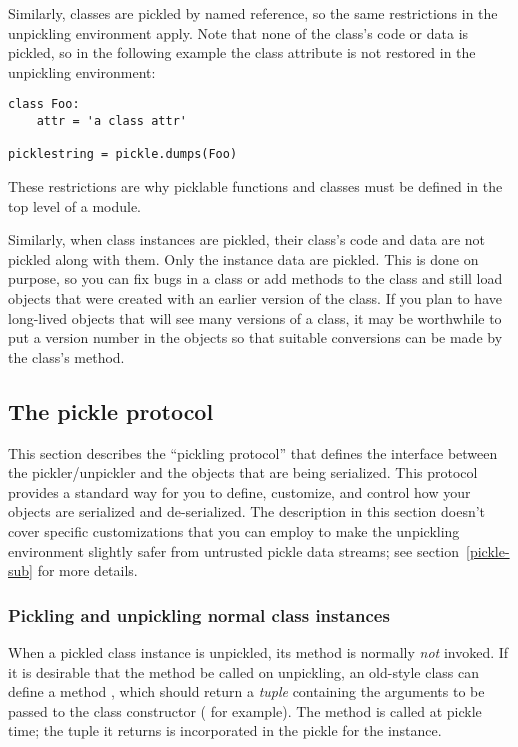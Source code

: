 Similarly, classes are pickled by named reference, so the same
restrictions in the unpickling environment apply.  Note that none of
the class's code or data is pickled, so in the following example the
class attribute  is not restored in the unpickling
environment:

\begin{verbatim}
class Foo:
    attr = 'a class attr'

picklestring = pickle.dumps(Foo)
\end{verbatim}

These restrictions are why picklable functions and classes must be
defined in the top level of a module.

Similarly, when class instances are pickled, their class's code and
data are not pickled along with them.  Only the instance data are
pickled.  This is done on purpose, so you can fix bugs in a class or
add methods to the class and still load objects that were created with
an earlier version of the class.  If you plan to have long-lived
objects that will see many versions of a class, it may be worthwhile
to put a version number in the objects so that suitable conversions
can be made by the class's  method.

\subsection{The pickle protocol
\label{pickle-protocol}}

This section describes the ``pickling protocol'' that defines the
interface between the pickler/unpickler and the objects that are being
serialized.  This protocol provides a standard way for you to define,
customize, and control how your objects are serialized and
de-serialized.  The description in this section doesn't cover specific
customizations that you can employ to make the unpickling environment
slightly safer from untrusted pickle data streams; see section~\ref{pickle-sub}
for more details.

\subsubsection{Pickling and unpickling normal class
    instances\label{pickle-inst}}

When a pickled class instance is unpickled, its 
method is normally \emph{not} invoked.  If it is desirable that the
 method be called on unpickling, an old-style class
can define a method , which should return a
\emph{tuple} containing the arguments to be passed to the class
constructor ( for example).  The
 method is called at
pickle time; the tuple it returns is incorporated in the pickle for
the instance.

